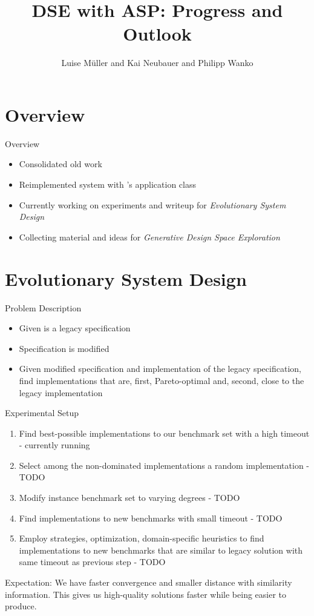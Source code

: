 \documentclass[11pt]{beamer}
\author[Müller et al.]{Luise Müller and Kai Neubauer and Philipp Wanko}
\title[DSE with ASP: Progress and Outlook]{DSE with ASP: Progress and Outlook}
\date{}
\begin{document}



\begin{frame}
\titlepage
\end{frame}

\section{Overview}

\begin{frame}{Overview}
\begin{itemize}
  \item Consolidated old work
  \item Reimplemented system with \clingo's application class
  \pause
  \item Currently working on experiments and writeup for \emph{Evolutionary System Design}
  \pause
  \item Collecting material and ideas for \emph{Generative Design Space Exploration}
\end{itemize}
\end{frame}

\section{Evolutionary System Design}

\begin{frame}{Problem Description}
  \begin{itemize}
    \item Given is a legacy specification
    \item Specification is modified
    \item Given modified specification and implementation of the legacy specification, find implementations that are, first, Pareto-optimal and, second, close to the legacy implementation
  \end{itemize}
\end{frame}

\begin{frame}{Experimental Setup}
  \begin{enumerate}
    \item Find best-possible implementations to our benchmark set with a high timeout - currently running
    \item Select among the non-dominated implementations a random implementation - TODO
    \item Modify instance benchmark set to varying degrees - TODO
    \item Find implementations to new benchmarks with small timeout - TODO
    \item Employ strategies, optimization, domain-specific heuristics to find implementations to new benchmarks that are similar to legacy solution with same timeout as previous step - TODO
  \end{enumerate}
  \pause
  Expectation: We have faster convergence and smaller distance with similarity information. 
  This gives us high-quality solutions faster while being easier to produce.
\end{frame}
\end{document}
